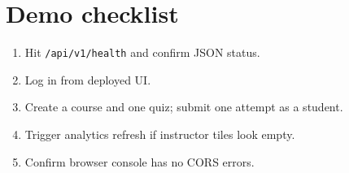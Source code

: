 \section{Demo checklist}
\begin{enumerate}[leftmargin=*]
  \item Hit \texttt{/api/v1/health} and confirm JSON status.

  \item Log in from deployed UI.

  \item Create a course and one quiz; submit one attempt as a student.

  \item Trigger analytics refresh if instructor tiles look empty.

  \item Confirm browser console has no CORS errors.

\end{enumerate}
